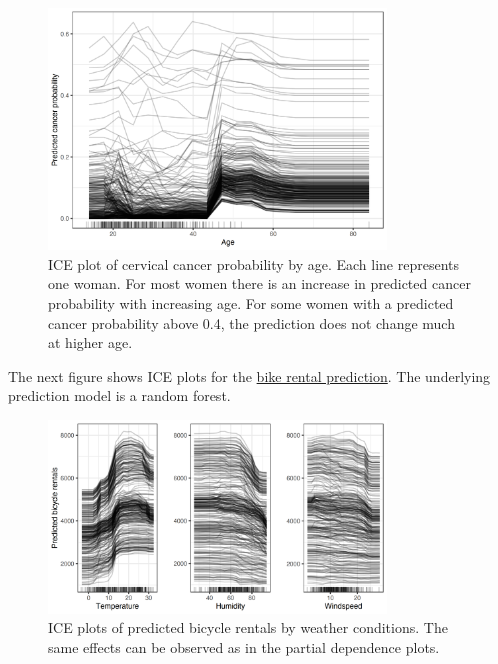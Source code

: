 \documentclass[
  10pt,
]{scrbook}
\begin{document}
\begin{figure}

{\centering \includegraphics[width=0.8\textwidth]{images/ice-cervical-1} 

}

\caption{ICE plot of cervical cancer probability by age. Each line represents one woman. For most women there is an increase in predicted cancer probability with increasing age. For some women with a predicted cancer probability above 0.4, the prediction does not change much at higher age.}\label{fig:ice-cervical}
\end{figure}

The next figure shows ICE plots for the \protect\hyperlink{bike-data}{bike rental prediction}.
The underlying prediction model is a random forest.

\begin{figure}

{\centering \includegraphics[width=0.8\textwidth]{images/ice-bike-1} 

}

\caption{ICE plots of predicted bicycle rentals by weather conditions. The same effects can be observed as in the partial dependence plots.}\label{fig:ice-bike}
\end{figure}
\end{document}
